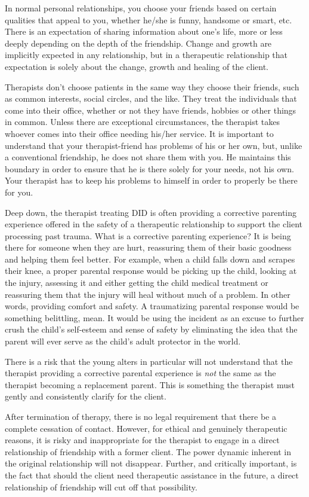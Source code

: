 \documentclass[]{book}
\begin{document}
In normal personal relationships, you choose your friends based on certain qualities that appeal to you, whether he/she is funny, handsome or smart, etc. There is an expectation of sharing information about one's life, more or less deeply depending on the depth of the friendship. Change and growth are implicitly expected in any relationship, but in a therapeutic relationship that expectation is solely about the change, growth and healing of the client.

Therapists don't choose patients in the same way they choose their friends, such as common interests, social circles, and the like. They treat the individuals that come into their office, whether or not they have friends, hobbies or other things in common. Unless there are exceptional circumstances, the therapist takes whoever comes into their office needing his/her service. It is important to understand that your therapist-friend has problems of his or her own, but, unlike a conventional friendship, he does not share them with you. He maintains this boundary in order to ensure that he is there solely for your needs, not his own. Your therapist has to keep his problems to himself in order to properly be there for you.

Deep down, the therapist treating DID is often providing a corrective parenting experience offered in the safety of a therapeutic relationship to support the client processing past trauma. What is a corrective parenting experience? It is being there for someone when they are hurt, reassuring them of their basic goodness and helping them feel better. For example, when a child falls down and scrapes their knee, a proper parental response would be picking up the child, looking at the injury, assessing it and either getting the child medical treatment or reassuring them that the injury will heal without much of a problem. In other words, providing comfort and safety. A traumatizing parental response would be something belittling, mean. It would be using the incident as an excuse to further crush the child's self-esteem and sense of safety by eliminating the idea that the parent will ever serve as the child's adult protector in the world.

There is a risk that the young alters in particular will not understand that the therapist providing a corrective parental experience is \emph{not} the same as the therapist becoming a replacement parent. This is something the therapist must gently and consistently clarify for the client.

After termination of therapy, there is no legal requirement that there be a complete cessation of contact. However, for ethical and genuinely therapeutic reasons, it is risky and inappropriate for the therapist to engage in a direct relationship of friendship with a former client. The power dynamic inherent in the original relationship will not disappear. Further, and critically important, is the fact that should the client need therapeutic assistance in the future, a direct relationship of friendship will cut off that possibility.
\end{document}
